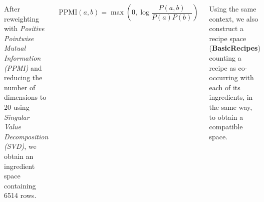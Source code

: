 \documentclass[a0paper, portrait]{tikzposter}
\begin{document}
\begin{columns}
{        \vspace{2cm}

        After reweighting with \textit{Positive Pointwise Mutual Information (PPMI)} and reducing the number of dimensions to 20 using \textit{Singular Value Decomposition (SVD)}, we obtain an ingredient space containing 6514 rows.

        \vspace{1cm}

        \begin{center}
        \begin{equation*} \label{eq:pmi}
            \mathrm{PPMI}(a,b) = \max\left(0,\log{\frac{P(a,b)}{P(a) P(b)}}\right)
        \end{equation*}
        \end{center}

        \vspace{1cm}

            Using the same context, we also construct a recipe space (\textbf{BasicRecipes}) counting a recipe as co-occurring with each of its ingredients, in the same way, to obtain a compatible space.

        }
\end{columns}
\end{document}
